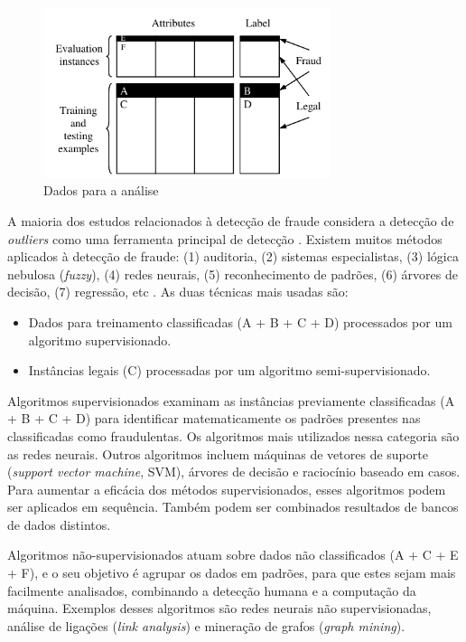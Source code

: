\begin{figure}[h!]
\centering
\includegraphics[width=0.75\textwidth]{img/fraud-data.png}
\caption{Dados para a análise}
\label{fig:fraud-data}
\end{figure}

A maioria dos estudos relacionados à detecção de fraude considera a detecção de \emph{outliers} como uma ferramenta principal de detecção \cite{Aral2011}. Existem muitos métodos aplicados à detecção de fraude: (1) auditoria, (2) sistemas especialistas, (3) lógica nebulosa (\emph{fuzzy}), (4) redes neurais, (5) reconhecimento de padrões, (6) árvores de decisão, (7) regressão, etc \cite{Huang2010}. As duas técnicas mais usadas são:

\begin{itemize}
\item Dados para treinamento classificadas (A + B + C + D) processados por um algoritmo supervisionado.
\item Instâncias legais (C) processadas por um algoritmo semi-supervisionado.
\end{itemize}

Algoritmos supervisionados examinam as instâncias previamente classificadas (A + B + C + D) para identificar matematicamente os padrões presentes nas classificadas como fraudulentas. Os algoritmos mais utilizados nessa categoria são as redes neurais. Outros algoritmos incluem máquinas de vetores de suporte (\emph{support vector machine}, SVM), árvores de decisão e raciocínio baseado em casos. Para aumentar a eficácia dos métodos supervisionados, esses algoritmos podem ser aplicados em sequência. Também podem ser combinados resultados de bancos de dados distintos.

Algoritmos não-supervisionados atuam sobre dados não classificados (A + C + E + F), e o seu objetivo é agrupar os dados em padrões, para que estes sejam mais facilmente analisados, combinando a detecção humana e a computação da máquina. Exemplos desses algoritmos são redes neurais não supervisionadas, análise de ligações (\emph{link analysis}) e mineração de grafos (\emph{graph mining}).

